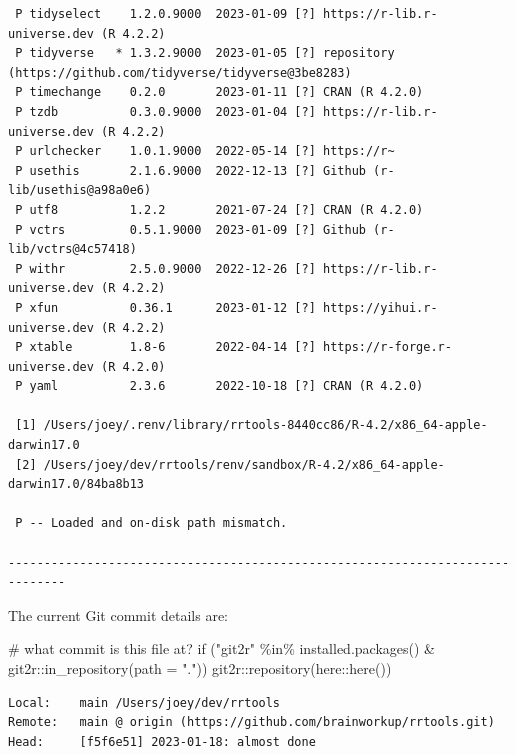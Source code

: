 \documentclass[
  super,
  preprint,
  3p]{elsarticle}
\newenvironment{Shaded}{\begin{snugshade}}{\end{snugshade}}
\newcommand{\AttributeTok}[1]{\textcolor[rgb]{0.40,0.45,0.13}{#1}}
\newcommand{\CommentTok}[1]{\textcolor[rgb]{0.37,0.37,0.37}{#1}}
\newcommand{\ControlFlowTok}[1]{\textcolor[rgb]{0.00,0.23,0.31}{#1}}
\newcommand{\FunctionTok}[1]{\textcolor[rgb]{0.28,0.35,0.67}{#1}}
\newcommand{\NormalTok}[1]{\textcolor[rgb]{0.00,0.23,0.31}{#1}}
\newcommand{\SpecialCharTok}[1]{\textcolor[rgb]{0.37,0.37,0.37}{#1}}
\newcommand{\StringTok}[1]{\textcolor[rgb]{0.13,0.47,0.30}{#1}}
\begin{document}
\begin{verbatim}
 P tidyselect    1.2.0.9000  2023-01-09 [?] https://r-lib.r-universe.dev (R 4.2.2)
 P tidyverse   * 1.3.2.9000  2023-01-05 [?] repository (https://github.com/tidyverse/tidyverse@3be8283)
 P timechange    0.2.0       2023-01-11 [?] CRAN (R 4.2.0)
 P tzdb          0.3.0.9000  2023-01-04 [?] https://r-lib.r-universe.dev (R 4.2.2)
 P urlchecker    1.0.1.9000  2022-05-14 [?] https://r~
 P usethis       2.1.6.9000  2022-12-13 [?] Github (r-lib/usethis@a98a0e6)
 P utf8          1.2.2       2021-07-24 [?] CRAN (R 4.2.0)
 P vctrs         0.5.1.9000  2023-01-09 [?] Github (r-lib/vctrs@4c57418)
 P withr         2.5.0.9000  2022-12-26 [?] https://r-lib.r-universe.dev (R 4.2.2)
 P xfun          0.36.1      2023-01-12 [?] https://yihui.r-universe.dev (R 4.2.2)
 P xtable        1.8-6       2022-04-14 [?] https://r-forge.r-universe.dev (R 4.2.0)
 P yaml          2.3.6       2022-10-18 [?] CRAN (R 4.2.0)

 [1] /Users/joey/.renv/library/rrtools-8440cc86/R-4.2/x86_64-apple-darwin17.0
 [2] /Users/joey/dev/rrtools/renv/sandbox/R-4.2/x86_64-apple-darwin17.0/84ba8b13

 P -- Loaded and on-disk path mismatch.

------------------------------------------------------------------------------
\end{verbatim}

The current Git commit details are:

\begin{Shaded}
\begin{Highlighting}[]
\CommentTok{\# what commit is this file at? }
\ControlFlowTok{if}\NormalTok{ (}\StringTok{"git2r"} \SpecialCharTok{\%in\%} \FunctionTok{installed.packages}\NormalTok{() }\SpecialCharTok{\&}\NormalTok{ git2r}\SpecialCharTok{::}\FunctionTok{in\_repository}\NormalTok{(}\AttributeTok{path =} \StringTok{"."}\NormalTok{)) git2r}\SpecialCharTok{::}\FunctionTok{repository}\NormalTok{(here}\SpecialCharTok{::}\FunctionTok{here}\NormalTok{())  }
\end{Highlighting}
\end{Shaded}

\begin{verbatim}
Local:    main /Users/joey/dev/rrtools
Remote:   main @ origin (https://github.com/brainworkup/rrtools.git)
Head:     [f5f6e51] 2023-01-18: almost done
\end{verbatim}


  
\end{document}
